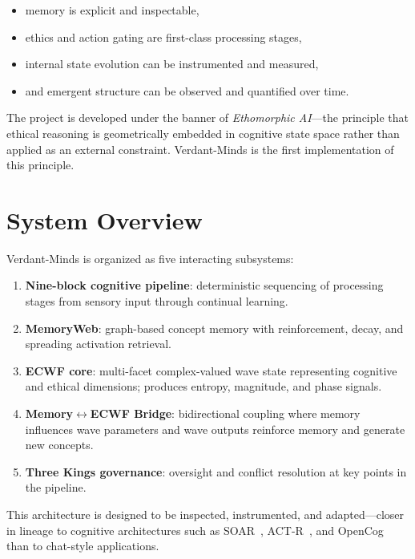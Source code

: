 \documentclass[11pt,a4paper]{article}
\begin{document}
\begin{itemize}[nosep]
    \item memory is explicit and inspectable,
    \item ethics and action gating are first-class processing stages,
    \item internal state evolution can be instrumented and measured,
    \item and emergent structure can be observed and quantified over time.
\end{itemize}

The project is developed under the banner of \textit{Ethomorphic AI}---the 
principle that ethical reasoning is geometrically embedded in cognitive state 
space rather than applied as an external constraint. Verdant-Minds is the 
first implementation of this principle.

\section{System Overview}

Verdant-Minds is organized as five interacting subsystems:

\begin{enumerate}[nosep]
    \item \textbf{Nine-block cognitive pipeline}: deterministic sequencing of 
          processing stages from sensory input through continual learning.
    \item \textbf{MemoryWeb}: graph-based concept memory with reinforcement, 
          decay, and spreading activation retrieval.
    \item \textbf{ECWF core}: multi-facet complex-valued wave state 
          representing cognitive and ethical dimensions; produces entropy, 
          magnitude, and phase signals.
    \item \textbf{Memory\texorpdfstring{$\leftrightarrow$}{-}ECWF Bridge}: bidirectional coupling 
          where memory influences wave parameters and wave outputs reinforce 
          memory and generate new concepts.
    \item \textbf{Three Kings governance}: oversight and conflict resolution 
          at key points in the pipeline.
\end{enumerate}

This architecture is designed to be inspected, instrumented, and adapted---closer 
in lineage to cognitive architectures such as SOAR~\cite{laird2012soar}, 
ACT-R~\cite{anderson2004actr}, and OpenCog~\cite{goertzel2014opencog} than 
to chat-style applications.
\end{document}
